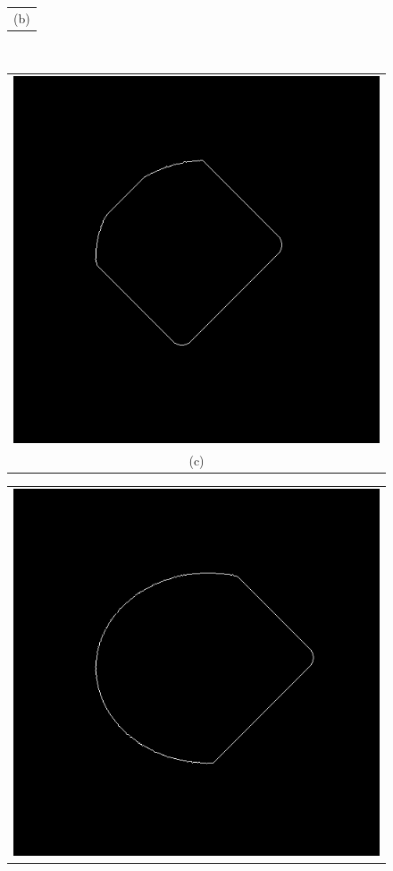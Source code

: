 \begin{figure}[h!]
\begin{minipage}{.49\textwidth}
\begin{tabular}{c}
(b)
\end{tabular}
\end{minipage}
\\
\begin{minipage}{.49\textwidth}
\begin{tabular}{c}
\includegraphics[width=.9\textwidth]{results/2D/circleZero1200} \\
(c)
\end{tabular}
\end{minipage}
\begin{minipage}{.49\textwidth}
\begin{tabular}{c}
\includegraphics[width=.9\textwidth]{results/2D/circleZero1600} \\

\end{tabular}
\end{minipage}
\end{figure}
